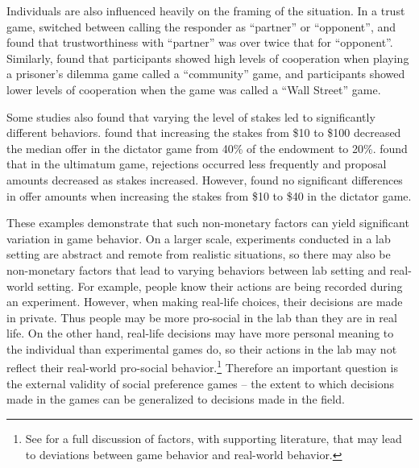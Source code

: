 \documentclass[12pt]{article}
\begin{document}
Individuals are also influenced heavily on the framing of the situation. In a trust game, \cite{burnham_mccabe_smith_2000} switched between calling the responder as ``partner'' or ``opponent'', and found that trustworthiness with ``partner'' was over twice that for ``opponent''. Similarly, \cite{ross_ward_1996} found that participants showed high levels of cooperation when playing a prisoner\rq s dilemma game called a ``community'' game, and participants showed lower levels of cooperation when the game was called a ``Wall Street'' game. 

Some studies also found that varying the level of stakes led to significantly different behaviors. \cite{carpenter_verhoogen_burks_2005} found that increasing the stakes from \$10 to \$100 decreased the median offer in the dictator game from 40\% of the endowment to 20\%. \cite{slonim_roth_1998} found that in the ultimatum game, rejections occurred less frequently and proposal amounts decreased as stakes increased. However, \cite{cherry_frykblom_shogren_2002} found no significant differences in offer amounts when increasing the stakes from \$10 to \$40 in the dictator game. 

These examples demonstrate that such non-monetary factors can yield significant variation in game behavior. On a larger scale, experiments conducted in a lab setting are abstract and remote from realistic situations, so there may also be non-monetary factors that lead to varying behaviors between lab setting and real-world setting. For example, people know their actions are being recorded during an experiment. However, when making real-life choices, their decisions are made in private. Thus people may be more pro-social in the lab than they are in real life. On the other hand, real-life decisions may have more personal meaning to the individual than experimental games do, so their actions in the lab may not reflect their real-world pro-social behavior.\footnote{See \cite{levitt_list_2007} for a full discussion of factors, with supporting literature, that may lead to deviations between game behavior and real-world behavior.} Therefore an important question is the external validity of social preference games -- the extent to which decisions made in the games can be generalized to decisions made in the field.
\end{document}
